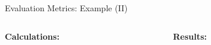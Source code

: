 \begin{frame}{Evaluation Metrics: Example (II)}
	\vspace*{-0.25cm}

	\begin{columns}
		\begin{column}{0.45\textwidth}
			\begin{center}
				\textbf{Calculations:}
			\end{center}
		\end{column}
		\begin{column}{0.45\textwidth}
			\begin{center}
				\textbf{Results:}
			\end{center}
		\end{column}
	\end{columns}

	\vspace*{-0.05cm}


\end{frame}

